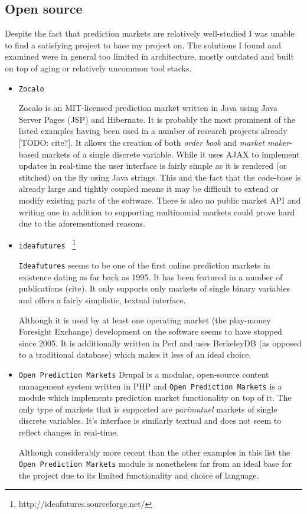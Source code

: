 \documentclass[bsc,frontabs,twoside,singlespacing,parskip,deptreport]{infthesis}     %
\begin{document}
\subsection{Open source}
    Despite the fact that prediction markets are relatively well-studied I was unable to find a satisfying project to base my project on. The solutions I found and examined were in general too limited in architecture, mostly outdated and built on top of aging or relatively uncommon tool stacks. 

\begin{itemize}

\item {\tt Zocalo}

	Zocalo is an MIT-licensed prediction market written in Java using Java Server Pages (JSP) and Hibernate. It is probably the most prominent of the listed examples having been used in a number of research projects already [TODO: cite?]. It allows the creation of both {\em order book} and {\em market maker}-based markets of a single discrete variable. While it uses AJAX to implement updates in real-time the user interface is fairly simple as it is rendered (or stitched) on the fly using Java strings. This and the fact that the code-base is already large and tightly coupled means it may be difficult to extend or modify existing parts of the software. There is also no public market API and writing one in addition to supporting multinomial markets could prove hard due to the aforementioned reasons. 

\item {\tt ideafutures } \footnote{http://ideafutures.sourceforge.net/}

	{\tt Ideafutures} seems to be one of the first online prediction markets in existence dating as far back as 1995. It has been featured in a number of publications (cite). It only supports only markets of single binary variables and offers a fairly simplistic, textual interface. 

Although it is used by at least one operating market (the play-money Foresight Exchange) development on the software seems to have stopped since 2005. It is additionally written in Perl and uses BerkeleyDB (as opposed to a traditional database) which makes it less of an ideal choice. 

\item {\tt Open Prediction Markets} 
	Drupal is a modular, open-source content management system written in PHP and {\tt Open Prediction Markets} is a module which implements prediction market functionality on top of it. The only type of markets that is supported are {\em parimutuel} markets of single discrete variables. It's interface is similarly textual and does not seem to reflect changes in real-time. 
	
    	Although considerably more recent than the other examples in this list the {\tt Open Prediction Markets} module is nonetheless far from an ideal base for the project due to its limited functionality and choice of language. 
	
\end{itemize}
\end{document}
